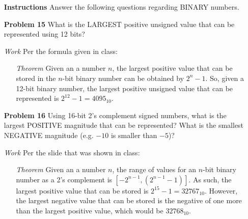 \documentclass[12pt]{article}
\begin{document}
\begin{enumerate}
  \item[\textbf{Instructions}] Answer the following questions regarding BINARY numbers.
\end{enumerate}

\begin{enumerate}
  \item[\textbf{Problem 15}] What is the LARGEST positive unsigned value that can be represented using 12 bits?
\end{enumerate}

\begin{enumerate}
  \item[\textit{Work}] Per the formula given in class:
  \begin{enumerate}
    \item[\textit{Theorem}] Given an a number $n$, the largest positive value that can be stored in the $n$-bit binary number can be obtained by $2^n-1$. So, given a 12-bit binary number, the largest positive unsigned value that can be represented is $2^{12}-1=4095_{10}$.
  \end{enumerate}
\end{enumerate}


\begin{enumerate}
  \item[\textbf{Problem 16}] Using 16-bit 2’s complement signed numbers, what is the largest POSITIVE magnitude that can be represented?  What is the smallest NEGATIVE magnitude (e.g. $-10$ is smaller than $-5$)?
\end{enumerate}

\begin{enumerate}
  \item[\textit{Work}] Per the slide that was shown in class:
  \begin{enumerate}
    \item[\textit{Theorem}] Given an a number $n$, the range of values for an $n$-bit binary number as a 2's complement is $[-2^{n-1},(2^{n-1}-1)]$. As such, the largest positive value that can be stored is $2^{15}-1=32767_{10
    }$. However, the largest negative value that can be stored is the negative of one more than the largest positive value, which would be $32768_{10}$.
  \end{enumerate}
\end{enumerate}
\end{document}
